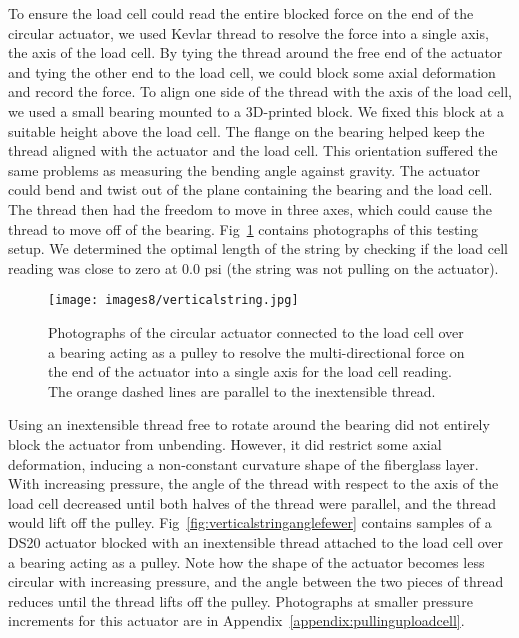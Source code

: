 To ensure the load cell could read the entire blocked force on the end of the circular actuator, we used Kevlar thread to resolve the force into a single axis, the axis of the load cell. By tying the thread around the free end of the actuator and tying the other end to the load cell, we could block some axial deformation and record the force. To align one side of the thread with the axis of the load cell, we used a small bearing mounted to a 3D-printed block. We fixed this block at a suitable height above the load cell. The flange on the bearing helped keep the thread aligned with the actuator and the load cell. This orientation suffered the same problems as measuring the bending angle against gravity. The actuator could bend and twist out of the plane containing the bearing and the load cell. The thread then had the freedom to move in three axes, which could cause the thread to move off of the bearing. Fig~\ref{fig:verticalstring} contains photographs of this testing setup. We determined the optimal length of the string by checking if the load cell reading was close to zero at 0.0 psi (the string was not pulling on the actuator). 

\begin{figure}[ht]
    \centering
     \texttt{[image: images8/verticalstring.jpg]}
    \caption{Photographs of the circular actuator connected to the load cell over a bearing acting as a pulley to resolve the multi-directional force on the end of the actuator into a single axis for the load cell reading. The orange dashed lines are parallel to the inextensible thread.}
    \label{fig:verticalstring}
\end{figure}

Using an inextensible thread free to rotate around the bearing did not entirely block the actuator from unbending. However, it did restrict some axial deformation, inducing a non-constant curvature shape of the fiberglass layer. With increasing pressure, the angle of the thread with respect to the axis of the load cell decreased until both halves of the thread were parallel, and the thread would lift off the pulley. Fig~\ref{fig:verticalstringanglefewer} contains samples of a DS20 actuator blocked with an inextensible thread attached to the load cell over a bearing acting as a pulley. Note how the shape of the actuator becomes less circular with increasing pressure, and the angle between the two pieces of thread reduces until the thread lifts off the pulley. Photographs at smaller pressure increments for this actuator are in Appendix~\ref{appendix:pullinguploadcell}. 

